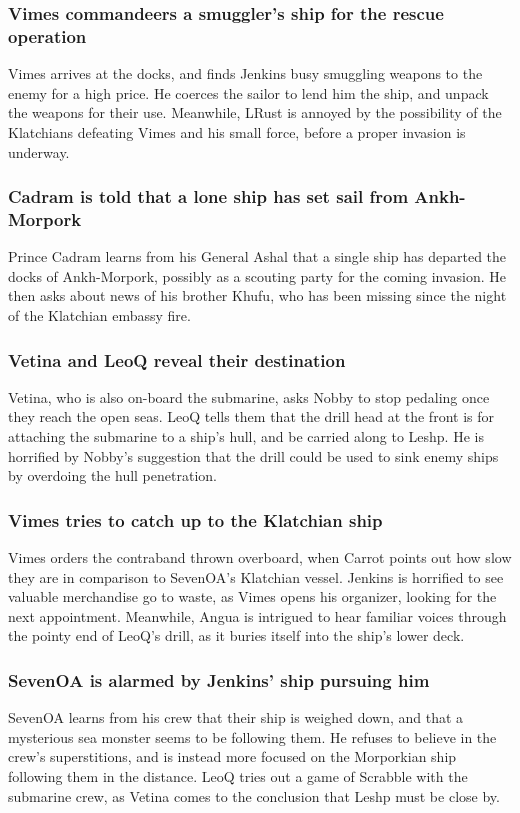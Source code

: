 \subsubsection{\Gls{Vimes} commandeers a smuggler's ship for the rescue operation}
\Gls{Vimes} arrives at the docks, and finds \Gls{Jenkins} busy smuggling weapons to the enemy for a
high price. He coerces the sailor to lend him the ship, and unpack the weapons for their use.
Meanwhile, \Gls{LRust} is annoyed by the possibility of the Klatchians defeating \Gls{Vimes} and
his small force, before a proper invasion is underway.

\subsubsection{\Gls{Cadram} is told that a lone ship has set sail from Ankh-Morpork}
Prince \Gls{Cadram} learns from his General \Gls{Ashal} that a single ship has departed the docks
of Ankh-Morpork, possibly as a scouting party for the coming invasion. He then asks about news of
his brother \Gls{Khufu}, who has been missing since the night of the Klatchian embassy fire.

\subsubsection{\Gls{Vetina} and \Gls{LeoQ} reveal their destination}
\Gls{Vetina}, who is also on-board the submarine, asks \Gls{Nobby} to stop pedaling once they
reach the open seas. \Gls{LeoQ} tells them that the drill head at the front is for attaching the
submarine to a ship's hull, and be carried along to Leshp. He is horrified by \Gls{Nobby}'s
suggestion that the drill could be used to sink enemy ships by overdoing the hull penetration.

\subsubsection{\Gls{Vimes} tries to catch up to the Klatchian ship}
\Gls{Vimes} orders the contraband thrown overboard, when \Gls{Carrot} points out how slow they are
in comparison to \Gls{SevenOA}'s Klatchian vessel. \Gls{Jenkins} is horrified to see valuable
merchandise go to waste, as \Gls{Vimes} opens his organizer, looking for the next appointment.
Meanwhile, \Gls{Angua} is intrigued to hear familiar voices through the pointy end of \Gls{LeoQ}'s
drill, as it buries itself into the ship's lower deck.

\subsubsection{\Gls{SevenOA} is alarmed by \Gls{Jenkins}' ship pursuing him}
\Gls{SevenOA} learns from his crew that their ship is weighed down, and that a mysterious sea
monster seems to be following them. He refuses to believe in the crew's superstitions, and is
instead more focused on the Morporkian ship following them in the distance. \Gls{LeoQ} tries out a
game of Scrabble with the submarine crew, as \Gls{Vetina} comes to the conclusion that Leshp must be
close by.

